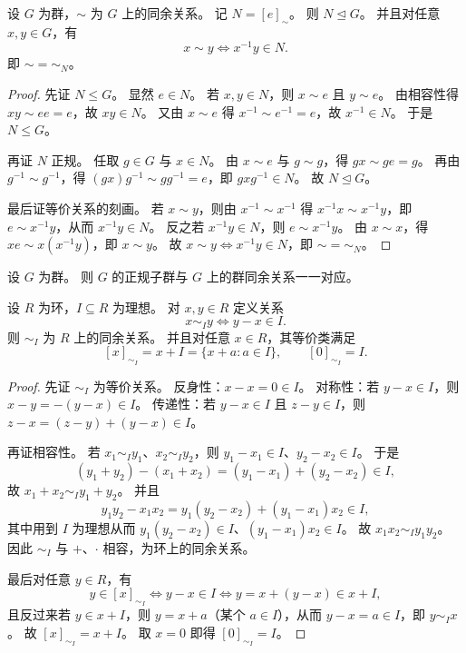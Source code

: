 \documentclass[lang=cn,a4paper,newtx]{elegantbook}
\begin{document}
\begin{proposition}[群同余的单位元等价类]
设 $G$ 为群，$\sim$ 为 $G$ 上的同余关系。
记 $N=[e]_{\sim}$。
则 $N\trianglelefteq G$。
并且对任意 $x,y\in G$，有
\[
  x\sim y\iff x^{-1}y\in N.
\]
即 $\sim=\sim_N$。
\end{proposition}

\begin{proof}
先证 $N\le G$。
显然 $e\in N$。
若 $x,y\in N$，则 $x\sim e$ 且 $y\sim e$。
由相容性得 $xy\sim ee=e$，故 $xy\in N$。
又由 $x\sim e$ 得 $x^{-1}\sim e^{-1}=e$，故 $x^{-1}\in N$。
于是 $N\le G$。

再证 $N$ 正规。
任取 $g\in G$ 与 $x\in N$。
由 $x\sim e$ 与 $g\sim g$，得 $gx\sim ge=g$。
再由 $g^{-1}\sim g^{-1}$，得 $(gx)g^{-1}\sim gg^{-1}=e$，即 $gxg^{-1}\in N$。
故 $N\trianglelefteq G$。

最后证等价关系的刻画。
若 $x\sim y$，则由 $x^{-1}\sim x^{-1}$ 得 $x^{-1}x\sim x^{-1}y$，即 $e\sim x^{-1}y$，从而 $x^{-1}y\in N$。
反之若 $x^{-1}y\in N$，则 $e\sim x^{-1}y$。
由 $x\sim x$，得 $xe\sim x(x^{-1}y)$，即 $x\sim y$。
故 $x\sim y\iff x^{-1}y\in N$，即 $\sim=\sim_N$。
\end{proof}

\begin{corollary}
设 $G$ 为群。
则 $G$ 的正规子群与 $G$ 上的群同余关系一一对应。
\end{corollary}

\begin{proposition}[理想诱导的环同余]\label{ideal-congruence}
设 $R$ 为环，$I\subseteq R$ 为理想。
对 $x,y\in R$ 定义关系
\[
  x\sim_I y\iff y-x\in I.
\]
则 $\sim_I$ 为 $R$ 上的同余关系。
并且对任意 $x\in R$，其等价类满足
\[
  [x]_{\sim_I}=x+I=\{x+a:a\in I\},\qquad [0]_{\sim_I}=I.
\]
\end{proposition}

\begin{proof}
先证 $\sim_I$ 为等价关系。
反身性：$x-x=0\in I$。
对称性：若 $y-x\in I$，则 $x-y=-(y-x)\in I$。
传递性：若 $y-x\in I$ 且 $z-y\in I$，则 $z-x=(z-y)+(y-x)\in I$。

再证相容性。
若 $x_1\sim_I y_1$、$x_2\sim_I y_2$，则 $y_1-x_1\in I$、$y_2-x_2\in I$。
于是
\[
  (y_1+y_2)-(x_1+x_2)=(y_1-x_1)+(y_2-x_2)\in I,
\]
故 $x_1+x_2\sim_I y_1+y_2$。
并且
\[
  y_1y_2-x_1x_2=y_1(y_2-x_2)+(y_1-x_1)x_2\in I,
\]
其中用到 $I$ 为理想从而 $y_1(y_2-x_2)\in I$、$(y_1-x_1)x_2\in I$。
故 $x_1x_2\sim_I y_1y_2$。
因此 $\sim_I$ 与 $+$、$\cdot$ 相容，为环上的同余关系。

最后对任意 $y\in R$，有
\[
  y\in [x]_{\sim_I}\iff y-x\in I\iff y=x+(y-x)\in x+I,
\]
且反过来若 $y\in x+I$，则 $y=x+a$（某个 $a\in I$），从而 $y-x=a\in I$，即 $y\sim_I x$。
故 $[x]_{\sim_I}=x+I$。
取 $x=0$ 即得 $[0]_{\sim_I}=I$。
\end{proof}
\end{document}
